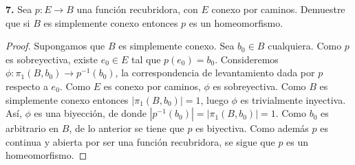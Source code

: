 \textbf{7.} Sea $p:E\to B$ una función recubridora, con $E$ conexo por caminos. Demuestre que si $B$ es simplemente conexo entonces $p$ es un homeomorfismo.
\begin{proof}
Supongamos que $B$ es simplemente conexo. Sea $b_0\in B$ cualquiera. Como $p$ es sobreyectiva, existe $e_0\in E$ tal que $p(e_0)=b_0$. Consideremos $\phi:\pi_1(B,b_0)\to p^{-1}(b_0)$, la correspondencia de levantamiento dada por $p$ respecto a $e_0$. Como $E$ es conexo por caminos, $\phi$ es sobreyectiva. Como $B$ es simplemente conexo entonces $|\pi_1(B,b_0)|=1$, luego $\phi$ es trivialmente inyectiva. Así, $\phi$ es una biyección, de donde $|p^{-1}(b_0)|=|\pi_1(B,b_0)|=1$. Como $b_0$ es arbitrario en $B$, de lo anterior se tiene que $p$ es biyectiva. Como además $p$ es continua y abierta por ser una función recubridora, se sigue que $p$ es un homeomorfismo.
\end{proof}\clearpage
